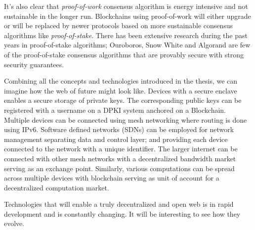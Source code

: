 	It's also clear that \textit{proof-of-work} consensus algorithm is energy intensive and not sustainable in the longer run. Blockchains using proof-of-work will either upgrade or will be replaced by newer protocols based on more sustainable consensus algorithms like \textit{proof-of-stake}. There has been extensive research during the past years in proof-of-stake algorithms; Ouroboros\cite{kiayias2017ouroboros}, Snow White\cite{daian2017snow} and Algorand\cite{gilad2017algorand} are few of the proof-of-stake consensus algorithms that are provably secure with strong security guarantees.
	
	Combining all the concepts and technologies introduced in the thesis, we can imagine how the web of future might look like. Devices with a secure enclave enables a secure storage of private keys. The corresponding public keys can be registered with a username on a DPKI system anchored on a Blockchain. Multiple devices can be connected using mesh networking where routing is done using IPv6. Software defined networks (SDNs) can be employed for network management separating data and control layer; and providing each device connected to the network with a unique identifier. The larger internet can be connected with other mesh networks with a decentralized bandwidth market serving as an exchange point. Similarly, various computations can be spread across multiple devices with blockchain serving as unit of account for a decentralized computation market.
	
	Technologies that will enable a truly decentralized and open web is in rapid development and is constantly changing. It will be interesting to see how they evolve.